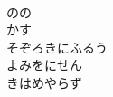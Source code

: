 \documentclass[10pt,b5j]{tarticle} %
\begin{document}
\begin{enumerate}
\begin{minipage}[c]{\blocksize}
    \end{minipage}
    \begin{minipage}[c]{\blocksize}
        
        \vspace{\linespace}
        \item~\\
        のの\\
        かす\\
        そぞろきにふるう\\
        よみをにせん\\
        きはめやらず
    
    \end{minipage}
\end{enumerate} %
\end{document}
